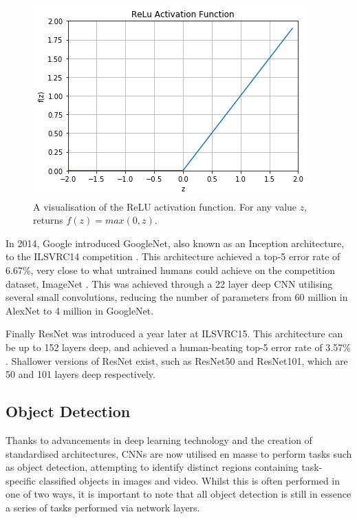 \begin{figure}
	\begin{center}
		\includegraphics[scale=0.8]{Chapter2/figs/relu.png}
	\end{center}
	\caption[A visualisation of the ReLU activation function.]{A visualisation of the ReLU activation function. For any value $z$, returns $f(z) = max(0, z)$.}
	\label{fig:relu}
\end{figure}

 In 2014, Google introduced GoogleNet, also known as an Inception architecture, to the ILSVRC14 competition \cite{szegedy_going_2015}. This architecture achieved a top-5 error rate of 6.67\%, very close to what untrained humans could achieve on the competition dataset, ImageNet \cite{krizhevsky_imagenet_2012}. This was achieved through a 22 layer deep CNN utilising several small convolutions, reducing the number of parameters from 60 million in AlexNet to 4 million in GoogleNet. 

Finally ResNet was introduced a year later at ILSVRC15. This architecture can be up to 152 layers deep, and achieved a human-beating top-5 error rate of 3.57\% \cite{he_deep_2015}. Shallower versions of ResNet exist, such as ResNet50 and ResNet101, which are 50 and 101 layers deep respectively.

\subsection{Object Detection}\label{ch:Background,sec:objectDetection}

Thanks to advancements in deep learning technology and the creation of standardised architectures, CNNs are now utilised en masse to perform tasks such as object detection, attempting to identify distinct regions containing task-specific classified objects in images and video. Whilst this is often performed in one of two ways, it is important to note that all object detection is still in essence a series of tasks performed via network layers. 

